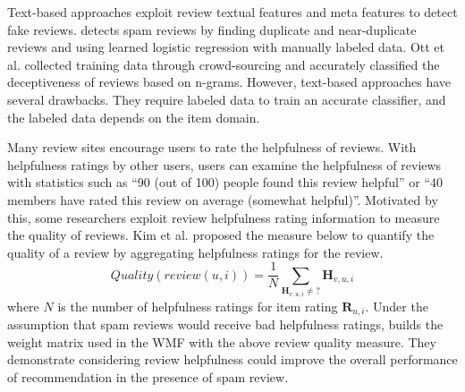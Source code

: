 \documentclass[master,english,final]{kaist-ucs}
\begin{document}
Text-based approaches \cite{text_duplicate, text_crowd,text_opinion_summarization,naive_helpfulness} exploit review textual features and meta features to detect fake reviews.
\cite{text_duplicate} detects spam reviews by finding duplicate and near-duplicate reviews and using learned logistic regression with manually labeled data.
Ott et al. \cite{text_crowd} collected training data through crowd-sourcing and accurately classified the deceptiveness of reviews based on n-grams.
However, text-based approaches have several drawbacks.
They require labeled data to train an accurate classifier, and the labeled data depends on the item domain.

%

Many review sites encourage users to rate the helpfulness of reviews.
With helpfulness ratings by other users, users can examine the helpfulness of reviews with statistics such as “90 (out of 100) people found this review helpful” or “40 members have rated this review on average (somewhat helpful)”.
Motivated by this, some researchers \cite{naive_helpfulness,RQMF} exploit review helpfulness rating information to measure the quality of reviews.
Kim et al. \cite{naive_helpfulness} proposed the measure below to quantify the quality of a review by aggregating helpfulness ratings for the review.
\begin{equation} \label{eq:naive_quality}
Quality(review(u,i))=\frac{1} {N} \sum_{\bm{H}_{v,u,i} \neq ?} \bm{H}_{v,u,i}
\end{equation}
where $N$ is the number of helpfulness ratings for item rating $\bm{R}_{u,i}$.
Under the assumption that spam reviews would receive bad helpfulness ratings, \cite{RQMF} builds the weight matrix used in the WMF with the above review quality measure.
They demonstrate considering review helpfulness could improve the overall performance of recommendation in the presence of spam review.
\end{document}

